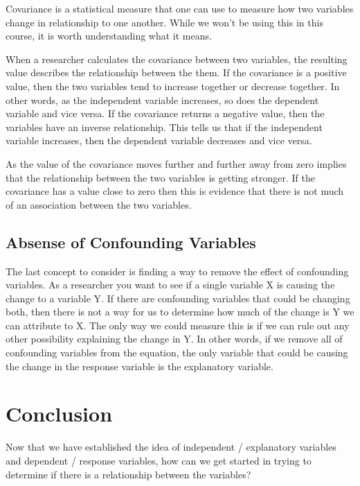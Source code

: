 \documentclass[
  letterpaper,
  DIV=11,
  numbers=noendperiod]{scrreprt}
\begin{document}
Covariance is a statistical measure that one can use to measure how two
variables change in relationship to one another. While we won't be using
this in this course, it is worth understanding what it means.

When a researcher calculates the covariance between two variables, the
resulting value describes the relationship between the them. If the
covariance is a positive value, then the two variables tend to increase
together or decrease together. In other words, as the independent
variable increases, so does the dependent variable and vice versa. If
the covariance returns a negative value, then the variables have an
inverse relationship. This tells us that if the independent variable
increases, then the dependent variable decreases and vice versa.

As the value of the covariance moves further and further away from zero
implies that the relationship between the two variables is getting
stronger. If the covariance has a value close to zero then this is
evidence that there is not much of an association between the two
variables.

\subsection*{Absense of Confounding
Variables}\label{absense-of-confounding-variables}

The last concept to consider is finding a way to remove the effect of
confounding variables. As a researcher you want to see if a single
variable X is causing the change to a variable Y. If there are
confounding variables that could be changing both, then there is not a
way for us to determine how much of the change is Y we can attribute to
X. The only way we could measure this is if we can rule out any other
possibility explaining the change in Y. In other words, if we remove all
of confounding variables from the equation, the only variable that could
be causing the change in the response variable is the explanatory
variable.

\section*{Conclusion}\label{conclusion-2}


Now that we have established the idea of independent / explanatory
variables and dependent / response variables, how can we get started in
trying to determine if there is a relationship between the variables?
\end{document}
